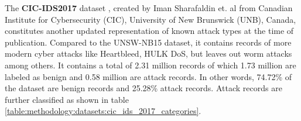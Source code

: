 The \textbf{CIC-IDS2017} dataset \cite{cic_ids_2017}, created by Iman Sharafaldin et. al from Canadian Institute for Cybersecurity (CIC), University of New Brunswick (UNB), Canada, constitutes another updated representation of known attack types at the time of publication. Compared to the UNSW-NB15 dataset, it contains records of more modern cyber attacks like Heartbleed, HULK DoS, but leaves out worm attacks among others. It contains a total of 2.31 million records of which 1.73 million are labeled as benign and 0.58 million are attack records. In other words, 74.72\% of the dataset are benign records and 25.28\% attack records. Attack records are further classified as shown in table \ref{table:methodology:datasets:cic_ids_2017_categories}.

\begin{table}[H]
	\centering
\end{table}
